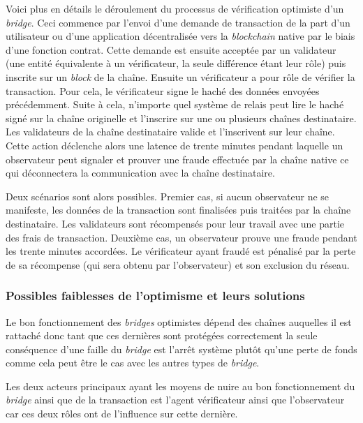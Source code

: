 Voici plus en détails le déroulement du processus de vérification optimiste d’un \textit{bridge}.
Ceci commence par l’envoi d'une demande de transaction de la part d’un utilisateur ou d’une application décentralisée vers la \textit{\gls{blockchain}} native par le biais d’une fonction contrat. Cette demande est ensuite acceptée par un validateur (une entité équivalente à un vérificateur, la seule différence étant leur rôle) puis inscrite sur un \textit{block} de la chaîne.\cite{NomadDocsVerification}
Ensuite un vérificateur a pour rôle de vérifier la transaction. Pour cela, le vérificateur signe le haché des données envoyées précédemment. 
Suite à cela, n’importe quel système de relais peut lire le haché signé sur la chaîne originelle et l’inscrire sur une ou plusieurs chaînes destinataire. Les validateurs de la chaîne destinataire valide et l'inscrivent sur leur chaîne. Cette action déclenche alors une latence de trente minutes pendant laquelle un observateur peut signaler et prouver une fraude effectuée par la chaîne native ce qui déconnectera la communication avec la chaîne destinataire. 

Deux scénarios sont alors possibles. Premier cas, si aucun observateur ne se manifeste, les données de la transaction sont finalisées puis traitées par la chaîne destinataire. Les validateurs sont récompensés pour leur travail avec une partie des frais de transaction. \cite{Fees} Deuxième cas, un observateur prouve une fraude pendant les trente minutes accordées. Le vérificateur ayant fraudé est pénalisé par la perte de sa récompense (qui sera obtenu par l'observateur) et son exclusion du réseau.\cite{EthereumSlashing}

\subsubsection{Possibles faiblesses de l’optimisme et leurs solutions}

Le bon fonctionnement des \textit{bridges} optimistes dépend des chaînes auquelles il est rattaché donc tant que ces dernières sont protégées correctement la seule conséquence d’une faille du \textit{bridge} est l’arrêt système plutôt qu’une perte de fonds comme cela peut être le cas avec les autres types de \textit{bridge}.

Les deux acteurs principaux ayant les moyens de nuire au bon fonctionnement du \textit{bridge} ainsi que de la transaction est l’agent vérificateur ainsi que l’observateur car ces deux rôles ont de l’influence sur cette dernière. \\

